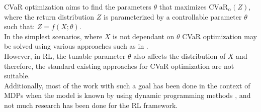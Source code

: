 CVaR optimization aims to find the parameters $\theta$ that maximizes 
$\text{CVaR}_\alpha (Z)$, where the return distribution $Z$ is parameterized by a 
controllable parameter $\theta$ such that: $Z = f(X; \theta)$.\\
In the simplest scenarios, where $X$ is not dependant on $\theta$ CVaR optimization may 
be solved using various approaches such as in \citet{Rockafellar2000}.\\
However, in RL, the tunable parameter $\theta$ also affects the 
distribution of $X$ and therefore, the standard existing approaches for CVaR optimization 
are not suitable.\\
Additionally, most of the work with such a goal has been done in the context of MDPs when
the model is known  by using dynamic programming methods \citep{Chow2015, Petrik2012},
and not much research has been done for the RL framework.

